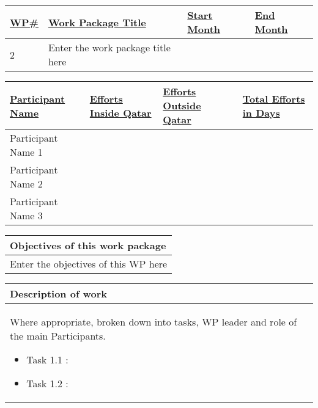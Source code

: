 \documentclass[a4paper,11pt]{nprp}
\newlength{\realwidth}
\begin{document}
\begin{center}

\setlength{\realwidth}{\dimexpr \textwidth - 8\tabcolsep - 5\arrayrulewidth}
\begin{tabular}{|p{0.1\realwidth}|p{0.6\realwidth}|p{0.15\realwidth}|p{0.15\realwidth}|}
\hline
  \textbf{\ul{WP\#}} & 
  \textbf{\ul{Work Package Title}} & 
  \textbf{\ul{Start Month}} &
  \textbf{\ul{End Month}} \\
\hline
2 & Enter the work package title here &  &  \\
\hline
\end{tabular}

\vspace{1em}

\setlength{\realwidth}{\dimexpr \textwidth - 8\tabcolsep - 5\arrayrulewidth}
\begin{tabular}{|p{0.4\realwidth}|p{0.22\realwidth}|p{0.2\realwidth}|C{0.18\realwidth}|}
\hline
  \textbf{\ul{Participant Name}} & 
  \textbf{\ul{Efforts Inside Qatar}} & 
  \textbf{\ul{Efforts Outside Qatar}} &
  \textbf{\ul{Total Efforts in Days}} \\
\hline
Participant Name 1 &  &  &  \\
\hline
Participant Name 2 &  &  &  \\
\hline
Participant Name 3 &  &  &  \\
\hline
\end{tabular}

\vspace{1em}

\setlength{\realwidth}{\dimexpr \textwidth - 2\tabcolsep - 2\arrayrulewidth}
\begin{tabular}{|p{1\realwidth}|}
\hline
\textbf{Objectives of this work package} \\
\hline
Enter the objectives of this WP here \\
\hline
\end{tabular}

\vspace{1em}

\begin{tabular}{|p{1\realwidth}|}
\hline
\textbf{Description of work} \\
\hline
Where appropriate, broken down into tasks, WP leader and role of the main Participants.
\begin{itemize}
  \item Task 1.1 :
  \item Task 1.2 :
\end{itemize}
 \\
\hline
\end{tabular}


\end{center}
\end{document}
